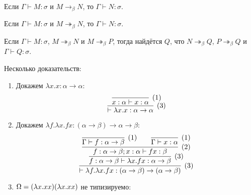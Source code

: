 \begin{lemma}
    Если $\Gamma \vdash M : \sigma$ и $M \rightarrow_{\beta}N$, то $\Gamma \vdash N : \sigma$.
\end{lemma}

\begin{corollary}
    Если $\Gamma \vdash M : \sigma$ и $M \twoheadrightarrow_{\beta}N$, то $\Gamma \vdash N : \sigma$.
\end{corollary}

\begin{theorem}
    Если $\Gamma \vdash M : \sigma$, $M \twoheadrightarrow_{\beta} N$ и $M \twoheadrightarrow_{\beta} P$, тогда найдётся $Q$, что
    $N \twoheadrightarrow_{\beta} Q$, $P \twoheadrightarrow_{\beta} Q$ и $\Gamma \vdash Q : \sigma$.
\end{theorem}

\begin{example} Несколько доказательств:
    \begin{enumerate}
        \item Докажем $\lambda x . x : \alpha \rightarrow \alpha$:
        \[
            \infer[(3)]
                {\vdash \lambda x . x : \alpha \rightarrow \alpha}
                { \infer[(1)]
                    {x : \alpha \vdash x : \alpha}
                    {}
                }
        \]

        \item Докажем $\lambda f . \lambda x . f x : (\alpha \rightarrow \beta) \rightarrow \alpha \rightarrow \beta$:
        \[
            \infer[(3)]
                { \vdash \lambda f . \lambda x . f x : (\alpha \rightarrow \beta) \rightarrow (\alpha \rightarrow \beta) }
                { \infer[(3)]
                    { f : \alpha \rightarrow \beta \vdash \lambda x . f x : \alpha \rightarrow \beta }
                    { \infer[(2)]
                        {f : \alpha \rightarrow \beta; x : \alpha \vdash f x : \beta}
                        {
                            \infer[(1)]{ \Gamma \vdash f : \alpha \rightarrow \beta }{} &&
                            \infer[(1)]{ \Gamma \vdash x : \alpha }{}
                        }
                    }
                }
        \]

        \item $\operatorname{\boldsymbol{\Omega}} = (\lambda x . x x) (\lambda x . x x)$ не типизируемо:
            \todo %
    \end{enumerate}
\end{example}

